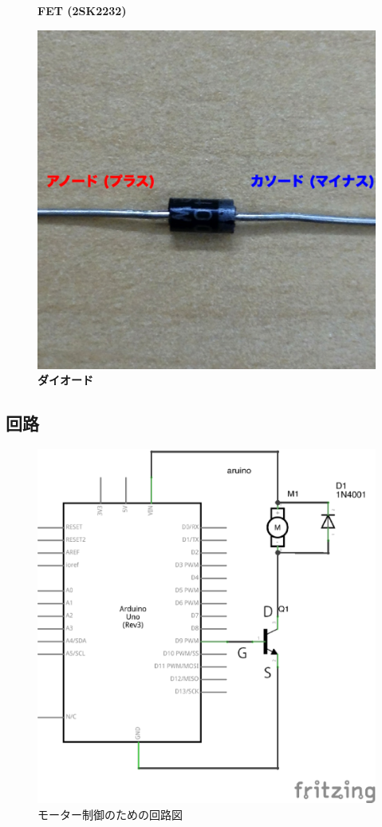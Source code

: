 \documentclass[11pt,a4paper]{jarticle}
\begin{document}
\begin{figure}[h!]
\begin{minipage}{0.32\columnwidth}
  \textbf{FET (2SK2232)}
 \end{minipage}
 \begin{minipage}{0.32\columnwidth}
  \centering
  \includegraphics[width=\columnwidth]{img/diode.eps}
  \textbf{ダイオード}
 \end{minipage}
\end{figure}


\subsection*{回路}
\begin{figure}[h!]
 \centering
 \includegraphics[width=0.5\columnwidth]{img/motor_control.eps}
 \caption{モーター制御のための回路図}
\end{figure}
\end{document}

